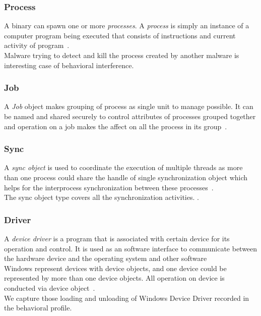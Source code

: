\subsubsection{Process}
\label{ssub:Process}
A binary can spawn one or more \emph{processes}.
A \emph{process} is simply an instance of a computer program being executed that consists of instructions and current activity of program~\cite[]{msprocess}.\\
Malware trying to detect and kill the process created by another malware is interesting case of behavioral interference.
\subsubsection{Job}
\label{ssub:Job}
A \emph{Job} object makes grouping of process as single unit to manage possible.
It can be named and shared securely to control attributes of processes grouped together and operation on a job makes the affect on all the process in its group~\cite[]{msjob}.
\subsubsection{Sync}
\label{ssub:Sync}
A \emph{sync object} is used to coordinate the execution of multiple threads as more than one process could share the handle of single synchronization object which helps for the interprocess synchronization between these processes~\cite[]{mssync}.\\
The sync object type covers all the synchronization activities.
\cite[]{mssync}.
\subsubsection{Driver}
\label{ssub:Driver}
A \emph{device driver } is a program that is associated with certain device for its operation and control. It is used as an software interface to communicate between the hardware device and the operating system and other software~\cite[]{devicedriver} \\
Windows represent devices with device objects, and one device could be represented by more than one device objects. All operation on device is conducted via device object~\cite[]{msdevice}.\\
We capture those loading and unloading of Windows Device Driver recorded in the behavioral profile.\\

